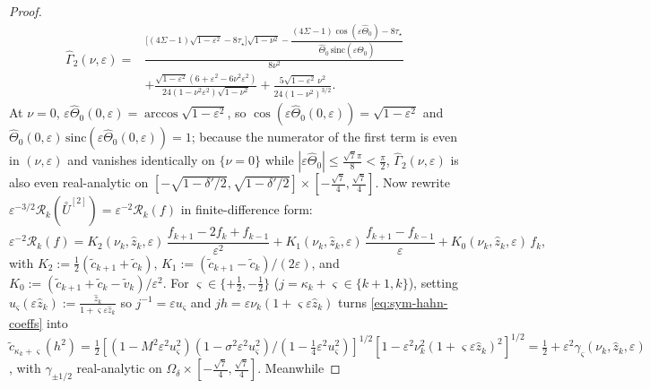 \documentclass[11pt]{article}
\theoremstyle{definition}
\theoremstyle{remark}
\newcommand{\cR}{\mathcal{R}}
\renewcommand{\_}{\oldunderscore\penalty0\hskip0pt\relax}
\begin{document}
\begin{proof}
\begin{equation}
\begin{aligned}
  \widehat{\Gamma}_2(\nu,\varepsilon) ={}& \frac{\bigl[(4\Sigma-1)\sqrt{1-\varepsilon^2}-8\tau_\star\bigr]\sqrt{1-\nu^2} -
    \dfrac{(4\Sigma-1)\cos(\varepsilon\widehat{\Theta}_0)-8\tau_\star}{\widehat{\Theta}_0\,\mathrm{sinc}(\varepsilon\widehat{\Theta}_0)}}{8\nu^2}\\
  &+ \frac{\sqrt{1-\varepsilon^2}(6+\varepsilon^2-6\nu^2\varepsilon^2)}{24(1-\nu^2\varepsilon^2)\sqrt{1-\nu^2}} + \frac{5\sqrt{1-\varepsilon^2}\,\nu^2}{24(1-\nu^2)^{3/2}}.
\end{aligned}
\end{equation}
At $\nu=0$, $\varepsilon\widehat{\Theta}_0(0,\varepsilon)=\arccos\sqrt{1-\varepsilon^2}$, so
  $\cos(\varepsilon\widehat{\Theta}_0(0,\varepsilon))=\sqrt{1-\varepsilon^2}$ and
  $\widehat{\Theta}_0(0,\varepsilon)\,\mathrm{sinc}(\varepsilon\widehat{\Theta}_0(0,\varepsilon))=1$; because the numerator of
  the first term is even in $(\nu,\varepsilon)$ and vanishes identically on $\{\nu=0\}$ while
  $|\varepsilon\widehat{\Theta}_0|\le\frac{\sqrt{7}\pi}{8}<\frac{\pi}{2}$, $\widehat{\Gamma}_2(\nu,\varepsilon)$ is also even
  real-analytic on $[-\sqrt{1-\delta'/2},\sqrt{1-\delta'/2}]\times[-\frac{\sqrt{7}}{4},\frac{\sqrt{7}}{4}]$. Now rewrite
  $\varepsilon^{-3/2}\cR_k(\stackrel{\circ}{U}^{[2]})=\varepsilon^{-2}\cR_k(f)$ in finite-difference form:
\begin{equation}
  \varepsilon^{-2}\cR_k(f) = K_2(\nu_k,\hat{z}_k,\varepsilon)\,\frac{f_{k+1}-2f_k+f_{k-1}}{\varepsilon^2} +
    K_1(\nu_k,\hat{z}_k,\varepsilon)\,\frac{f_{k+1}-f_{k-1}}{\varepsilon} + K_0(\nu_k,\hat{z}_k,\varepsilon)\,f_k,
  \label{eq:rescaled-residual-decomp}
\end{equation}
with $K_2:=\frac12(\tilde{c}_{k+1}+\tilde{c}_k)$, $K_1:=(\tilde{c}_{k+1}-\tilde{c}_k)/(2\varepsilon)$, and
  $K_0:=(\tilde{c}_{k+1}+\tilde{c}_k-\tilde{v}_k)/\varepsilon^2$. For $\varsigma\in\{+\frac12,-\frac12\}$
  ($j=\kappa_k+\varsigma\in\{k+1,k\}$), setting
  $u_\varsigma(\varepsilon\hat{z}_k):=\frac{\hat{z}_k}{1+\varsigma\varepsilon\hat{z}_k}$ so $j^{-1}=\varepsilon u_\varsigma$ and
  $jh=\varepsilon\nu_k(1+\varsigma\varepsilon\hat{z}_k)$ turns \eqref{eq:sym-hahn-coeffs} into
  $\tilde{c}_{\kappa_k+\varsigma}(h^2)=\frac12[(1-M^2\varepsilon^2 u_\varsigma^2)(1-\sigma^2\varepsilon^2
  u_\varsigma^2)/(1-\frac14\varepsilon^2
  u_\varsigma^2)]^{1/2}[1-\varepsilon^2\nu_k^2(1+\varsigma\varepsilon\hat{z}_k)^2]^{1/2}=\frac12+\varepsilon^2\gamma_\varsigma(\nu_k,\hat{z}_k,\varepsilon)$,
  with $\gamma_{\pm 1/2}$ real-analytic on $\Omega_\delta\times[-\frac{\sqrt{7}}{4},\frac{\sqrt{7}}{4}]$. Meanwhile

\end{proof}
\end{document}
